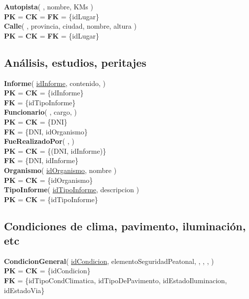 \textbf{Autopista}(
    \uline{},
    nombre,
    KMs
)\\
\textbf{PK} = \textbf{CK} = \textbf{FK} = \{idLugar\}\\


\textbf{Calle}(
    \uline{},
    provincia,
    ciudad,
    nombre,
    altura
)\\
\textbf{PK} = \textbf{CK} = \textbf{FK} = \{idLugar\}\\


\subsection{Análisis, estudios, peritajes}

\textbf{Informe}(
    \uline{idInforme},
    contenido,
)\\
\textbf{PK} = \textbf{CK} = \{idInforme\}\\
\textbf{FK} = \{idTipoInforme\}\\

\textbf{Funcionario}(
    ,
    cargo,
)\\
\textbf{PK} = \textbf{CK} = \{DNI\}\\
\textbf{FK} = \{DNI, idOrganismo\}\\

\textbf{FueRealizadoPor}(
    ,
)\\
\textbf{PK} = \textbf{CK} = \{(DNI, idInforme)\}\\
\textbf{FK} = \{DNI, idInforme\}\\

\textbf{Organismo}(
    \uline{idOrganismo},
    nombre
)\\
\textbf{PK} = \textbf{CK} = \{idOrganismo\}\\

\textbf{TipoInforme}(
    \uline{idTipoInforme},
    descripcion
)\\
\textbf{PK} = \textbf{CK} = \{idTipoInforme\}\\


\subsection{Condiciones de clima, pavimento, iluminación, etc}

\textbf{CondicionGeneral}(
    \uline{idCondicion},
    elementoSeguridadPeatonal,
    ,
    ,
    ,
)\\
\textbf{PK} = \textbf{CK} = \{idCondicion\}\\
\textbf{FK} = \{idTipoCondClimatica, idTipoDePavimento, idEstadoIluminacion, idEstadoVia\}\\


